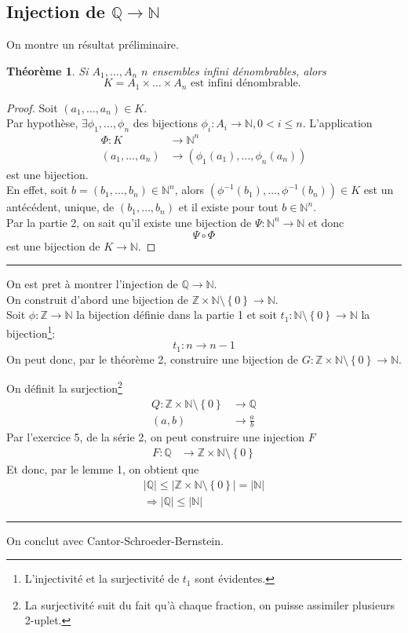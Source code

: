 \documentclass[11pt, a4paper]{article}
\newcommand\hr{
    \noindent\rule[0.5ex]{\linewidth}{0.5pt}\newline
}
\newtheorem{theorem}{Théorème}
\begin{document}
\subsection*{Injection de $\mathbb{Q} \to \mathbb{N}$}
On montre un résultat préliminaire.\\
\begin{theorem}
Si $ A_1, \ldots, A_n$ $n$ ensembles infini dénombrables, alors
\[ 
K=A_1 \times \ldots \times A_n \text{ est infini dénombrable. } 
\]
\end{theorem}
\begin{proof}
	Soit $(a_1, \ldots, a_n) \in K $.\\
	Par hypothèse, $\exists \phi_1,\ldots, \phi_n$ des bijections $\phi_i: A_i \to \mathbb{N}, 0<i\leq n$.
	L'application
	\begin{align*}
		\Phi: K &\to \mathbb{N}^{n}\\
		( a_1,\ldots, a_n) &\to ( \phi_1(a_1), \ldots, \phi_n(a_n))
	\end{align*}
	est une bijection.\\
	En effet, soit $b=(b_1,\ldots,b_n) \in \mathbb{N}^{n}$, alors $(\phi^{-1}(b_1), \ldots, \phi^{-1}(b_n)) \in K$ est un antécédent, unique, de $(b_1,\ldots, b_n)$ et il existe pour tout $ b \in \mathbb{N}^{n} $.\\
	Par la partie 2, on sait qu'il existe une bijection de $\Psi: \mathbb{N}^{n} \to \mathbb{N}$ et donc
	\[ 
	\Psi \circ \Phi
	\]
	est une bijection de $K \to \mathbb{N}$.
\end{proof}
\hr
On est pret à montrer l'injection de $\mathbb{Q} \to \mathbb{N}$.\\
On construit d'abord une bijection de $ \mathbb{Z} \times \mathbb{N} \setminus \left\{ 0 \right\} \to \mathbb{N} $.\\
Soit $\phi: \mathbb{Z} \to \mathbb{N}$ la bijection définie dans la partie 1 et soit $t_1: \mathbb{N} \setminus \left\{ 0 \right\} \to \mathbb{N}$ la bijection\footnote{L'injectivité et la surjectivité de $t_1$ sont évidentes.}:
\[ 
t_1: n \to n-1
\]
On peut donc, par le théorème 2, construire une bijection de $G:\mathbb{Z} \times \mathbb{N} \setminus \left\{ 0 \right\} \to \mathbb{N} $.

On définit la surjection\footnote{La surjectivité suit du fait qu'à chaque fraction, on puisse assimiler plusieurs 2-uplet.}
 \begin{align*}
	 Q: \mathbb{Z} \times \mathbb{N} \setminus \left\{ 0 \right\} &\to \mathbb{Q}\\
	 ( a,b) & \to \frac{a}{b}
\end{align*}
Par l'exercice 5, de la série 2, on peut construire une injection $F$
\begin{align*}
	F: \mathbb{Q} &\to \mathbb{Z} \times \mathbb{N} \setminus \left\{ 0 \right\} 
\end{align*}
Et donc, par le lemme 1, on obtient que
\begin{align*}
|\mathbb{Q}| \leq |\mathbb{Z} \times \mathbb{N} \setminus \left\{ 0 \right\}| = |\mathbb{N}|\\
\Rightarrow | \mathbb{Q}| \leq |\mathbb{N}|
\end{align*}
\hr
On conclut avec Cantor-Schroeder-Bernstein.
\end{document}

